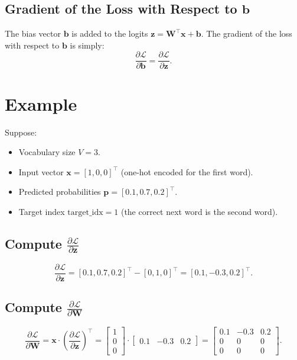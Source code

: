 \begin{notechapter}
\subsection{Gradient of the Loss with Respect to \(\mathbf{b}\)}
The bias vector \(\mathbf{b}\) is added to the logits
\(\mathbf{z} = \mathbf{W}^\top \mathbf{x} + \mathbf{b}\). The gradient of the
loss with respect to \(\mathbf{b}\) is simply:
\[
\frac{\partial \mathcal{L}}{\partial \mathbf{b}} = 
\frac{\partial \mathcal{L}}{\partial \mathbf{z}}.
\]

\section{Example}
Suppose:
\begin{itemize}
    \item Vocabulary size \( V = 3 \).
    \item Input vector \(\mathbf{x} = [1, 0, 0]^\top\) (one-hot encoded for
          the first word).
    \item Predicted probabilities \(\mathbf{p} = [0.1, 0.7, 0.2]^\top\).
    \item Target index \(\text{target\_idx} = 1\) (the correct next word is
          the second word).
\end{itemize}

\subsection{Compute \(\frac{\partial \mathcal{L}}{\partial \mathbf{z}}\)}
\[
\frac{\partial \mathcal{L}}{\partial \mathbf{z}} = 
[0.1, 0.7, 0.2]^\top - [0, 1, 0]^\top = [0.1, -0.3, 0.2]^\top.
\]

\subsection{Compute \(\frac{\partial \mathcal{L}}{\partial \mathbf{W}}\)}
\[
\frac{\partial \mathcal{L}}{\partial \mathbf{W}} = 
\mathbf{x} \cdot \left( \frac{\partial \mathcal{L}}{\partial \mathbf{z}} \right)^\top = 
\begin{bmatrix}
1 \\ 0 \\ 0
\end{bmatrix}
\cdot
\begin{bmatrix}
0.1 & -0.3 & 0.2
\end{bmatrix}
=
\begin{bmatrix}
0.1 & -0.3 & 0.2 \\
0 & 0 & 0 \\
0 & 0 & 0
\end{bmatrix}.
\]


\end{notechapter}
